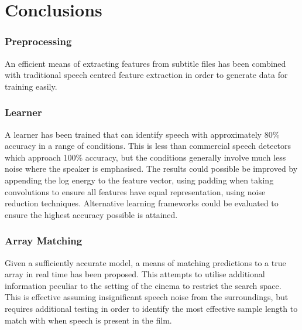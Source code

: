 
\chapter{Conclusions} %

\label{ChapterX} %

\subsection{Preprocessing}
An efficient means of extracting features from subtitle files has been combined with traditional speech centred feature extraction in order to generate data for training easily.

\subsection{Learner}
A learner has been trained that can identify speech with approximately 80\% accuracy in a range of conditions. This is less than commercial speech detectors which approach 100\% accuracy, but the conditions generally involve much less noise where the speaker is emphasised. The results could possible be improved by appending the log energy to the feature vector, using padding when taking convolutions to ensure all features have equal representation, using noise reduction techniques. Alternative learning frameworks could be evaluated to ensure the highest accuracy possible is attained.

\subsection{Array Matching}
Given a sufficiently accurate model, a means of matching predictions to a true array in real time has been proposed. This attempts to utilise additional information peculiar to the setting of the cinema to restrict the search space. This is effective assuming insignificant speech noise from the surroundings, but requires additional testing in order to identify the most effective sample length to match with when speech is present in the film.



